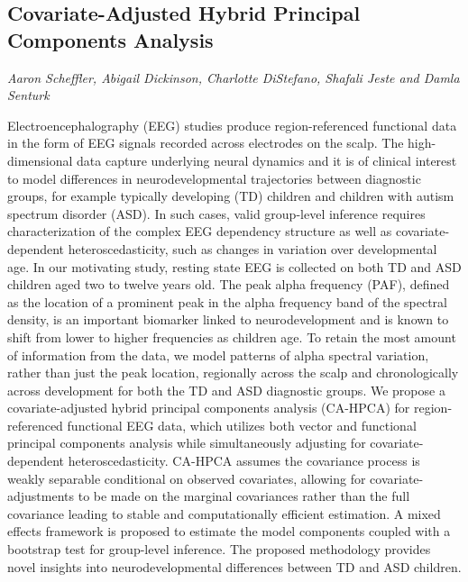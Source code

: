 \documentclass[../booklet.tex]{subfiles}
\begin{document}
\subsection[Covariate-Adjusted Hybrid Principal Components Analysis. {\it Aaron Scheffler, Abigail Dickinson, Charlotte DiStefano, Shafali Jeste and Damla Senturk}]{Covariate-Adjusted Hybrid Principal Components Analysis}
    

\begin{center}
  {\it Aaron Scheffler, Abigail Dickinson, Charlotte DiStefano, Shafali Jeste and Damla Senturk}
\end{center}



Electroencephalography (EEG) studies produce region-referenced functional data in the form of EEG signals recorded across electrodes on the scalp. The high-dimensional data capture underlying neural dynamics and it is of clinical interest to model differences in neurodevelopmental trajectories between diagnostic groups, for example typically developing (TD) children and children with autism spectrum disorder (ASD). In such cases, valid group-level inference requires characterization of the complex EEG dependency structure as well as covariate-dependent heteroscedasticity, such as changes in variation over developmental age. In our motivating study, resting state EEG is collected on both TD and ASD children aged two to twelve years old. The peak alpha frequency (PAF), defined as the location of a prominent peak in the alpha frequency band of the spectral density, is an important biomarker linked to neurodevelopment and is known to shift from lower to higher frequencies as children age. To retain the most amount of information from the data, we model patterns of alpha spectral variation, rather than just the peak location, regionally across the scalp and chronologically across development for both the TD and ASD diagnostic groups. We propose a covariate-adjusted hybrid principal components analysis (CA-HPCA) for region-referenced functional EEG data, which utilizes both vector and functional principal components analysis while simultaneously adjusting for covariate-dependent heteroscedasticity. CA-HPCA assumes the covariance process is weakly separable conditional on observed covariates, allowing for covariate-adjustments to be made on the marginal covariances rather than the full covariance leading to stable and computationally efficient estimation. A mixed effects framework is proposed to estimate the model components coupled with a bootstrap test for group-level inference. The proposed methodology provides novel insights into neurodevelopmental differences between TD and ASD children. 

\end{document}
